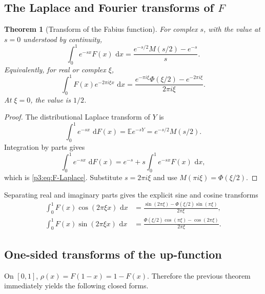 \documentclass[11pt,oneside]{article}
\newtheorem{theorem}{Theorem}[section]
\theoremstyle{definition}
\newcommand{\dd}{\,\mathrm d}
\newcommand{\E}{\mathbb E}
\begin{document}
\subsection{The Laplace and Fourier transforms of \(F\)}

\begin{theorem}[Transform of the Fabius function]\label{p3:thm:F-transform}
For complex \(s\), with the value at \(s=0\) understood by continuity,
\begin{equation}
 \boxed{
 \int_0^1 e^{-sx}F(x)\,\dd x
 =\frac{e^{-s/2}M(s/2)-e^{-s}}{s}.
 }                                                           \label{p3:eq:F-Laplace}
\end{equation}
Equivalently, for real or complex \(\xi\),
\begin{equation}
 \boxed{
 \int_0^1F(x)e^{-2\pi i\xi x}\,\dd x
 =\frac{e^{-\pi i\xi}\Phi(\xi/2)-e^{-2\pi i\xi}}{2\pi i\xi}.
 }                                                           \label{p3:eq:F-Fourier}
\end{equation}
At \(\xi=0\), the value is \(1/2\).
\end{theorem}

\begin{proof}
The distributional Laplace transform of \(Y\) is
\begin{equation}
 \int_0^1 e^{-sx}\,\dd F(x)=\E e^{-sY}=e^{-s/2}M(s/2).       \label{p3:eq:dF-Laplace}
\end{equation}
Integration by parts gives
\[
 \int_0^1e^{-sx}\,\dd F(x)
 =e^{-s}+s\int_0^1e^{-sx}F(x)\,\dd x,
\]
which is \eqref{p3:eq:F-Laplace}.  Substitute \(s=2\pi i\xi\) and use
\(M(\pi i\xi)=\Phi(\xi/2)\).
\end{proof}

Separating real and imaginary parts gives the explicit sine and cosine transforms
\begin{align}
 \int_0^1F(x)\cos(2\pi\xi x)\,\dd x
 &=\frac{\sin(2\pi\xi)-\Phi(\xi/2)\sin(\pi\xi)}{2\pi\xi},    \label{p3:eq:F-cosine-transform}\\
 \int_0^1F(x)\sin(2\pi\xi x)\,\dd x
 &=\frac{\Phi(\xi/2)\cos(\pi\xi)-\cos(2\pi\xi)}{2\pi\xi}. \label{p3:eq:F-sine-transform}
\end{align}

\subsection{One-sided transforms of the up-function}

On \([0,1]\), \(\rho(x)=F(1-x)=1-F(x)\).  Therefore the previous theorem immediately
yields the following closed forms.
\end{document}

